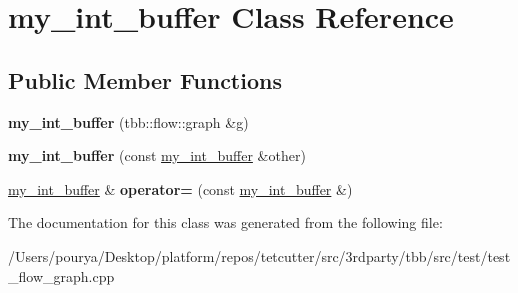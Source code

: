 \hypertarget{classmy__int__buffer}{}\section{my\+\_\+int\+\_\+buffer Class Reference}
\label{classmy__int__buffer}
\subsection*{Public Member Functions}
\begin{DoxyCompactItemize}
\item 
\hypertarget{classmy__int__buffer_ae63c2c6484d32fa2d8c01ed95ab2fbbf}{}{\bfseries my\+\_\+int\+\_\+buffer} (tbb\+::flow\+::graph \&g)\label{classmy__int__buffer_ae63c2c6484d32fa2d8c01ed95ab2fbbf}

\item 
\hypertarget{classmy__int__buffer_ac6e4485de7b6e4365829252c56bec2c5}{}{\bfseries my\+\_\+int\+\_\+buffer} (const \hyperlink{classmy__int__buffer}{my\+\_\+int\+\_\+buffer} \&other)\label{classmy__int__buffer_ac6e4485de7b6e4365829252c56bec2c5}

\item 
\hypertarget{classmy__int__buffer_ae1b252311dbcfafe18a9c1a34deeb321}{}\hyperlink{classmy__int__buffer}{my\+\_\+int\+\_\+buffer} \& {\bfseries operator=} (const \hyperlink{classmy__int__buffer}{my\+\_\+int\+\_\+buffer} \&)\label{classmy__int__buffer_ae1b252311dbcfafe18a9c1a34deeb321}

\end{DoxyCompactItemize}


The documentation for this class was generated from the following file\+:\begin{DoxyCompactItemize}
\item 
/\+Users/pourya/\+Desktop/platform/repos/tetcutter/src/3rdparty/tbb/src/test/test\+\_\+flow\+\_\+graph.\+cpp\end{DoxyCompactItemize}
